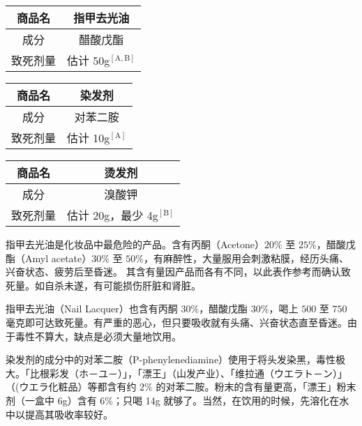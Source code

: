 \documentclass[UTF8]{ctexart}
\begin{document}
\begin{table}[htbp]
\begin{center}
\begin{tabular}{cc}

\toprule
商品名 & 指甲去光油 \\
\midrule
成分 & 醋酸戊酯 \\
致死剂量 & 估计 50g$^\mathrm{[A,B]}$ \\
\bottomrule
\end{tabular}
\end{center}
\end{table}

\begin{table}[htbp]
\begin{center}
\begin{tabular}{cc}

\toprule
商品名 & 染发剂 \\
\midrule
成分 & 对苯二胺 \\
致死剂量 & 估计 10g$^\mathrm{[A]}$ \\
\bottomrule
\end{tabular}
\end{center}
\end{table}


\begin{table}[htbp]
\begin{center}
\begin{tabular}{cc}

\toprule
商品名 & 烫发剂 \\
\midrule
成分 & 溴酸钾 \\
致死剂量 & 估计 20g，最少 4g$^\mathrm{[B]}$ \\
\bottomrule
\end{tabular}
\end{center}
\end{table}



指甲去光油是化妆品中最危险的产品。含有丙酮（Acetone）$20\%$ 至 $25\%$，醋酸戊酯（Amyl acetate）$30\%$ 至 $50\%$，有麻醉性，大量服用会刺激粘膜，经历头痛、兴奋状态、疲劳后至昏迷。
其含有量因产品而各有不同，以此表作参考而确认致死量。如自杀未遂，有可能损伤肝脏和肾脏。

指甲去光油（Nail Lacquer）也含有丙酮 $30\%$，醋酸戊酯 $30\%$，喝上 $500$ 至 $750$
毫克即可达致死量。有严重的恶心，但只要吸收就有头痛、兴奋状态直至昏迷。由于毒性不算大，缺点是必须大量地饮用。

染发剂的成分中的对苯二胺（P-phenylenediamine）使用于将头发染黑，毒性极大。「比根彩发（ホ－ユ－）」，「漂王」（山发产业）、「维拉通（ウエラト－ン）」（(ウエラ化粧品）等都含有约 $2\%$ 的对苯二胺。粉末的含有量更高，「漂王」粉末剂（一盒中 6g）含有 $6\%$；只喝 14g 就够了。当然，在饮用的时候，先溶化在水中以提高其吸收率较好。
\end{document}
